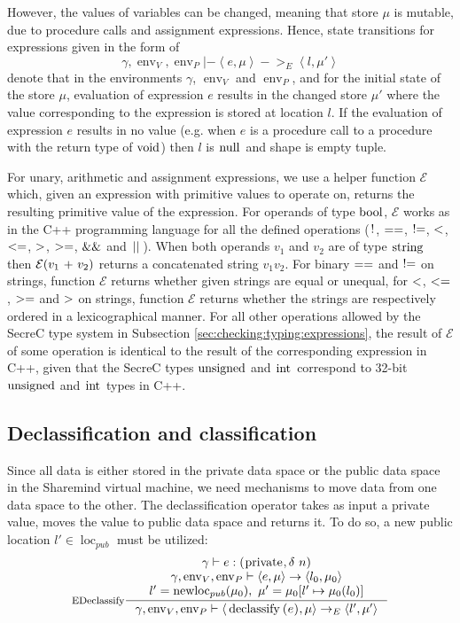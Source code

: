 \documentclass[a4paper, 10pt, draft]{report}
\DeclareMathOperator*{\env}{env}
\DeclareMathOperator*{\newloc}{newloc}
\newcommand{\mycode}[1]{\ensuremath{\mbox{\lstinline{#1}}}}
\begin{document}
However, the values of variables can be changed, meaning that store $\mu$ is
mutable, due to procedure calls and assignment expressions. Hence, state
transitions for expressions given in the form of
\[
\gamma, \operatorname{env}_V, \operatorname{env}_P |-
  \left\langle e, \mu \right\rangle ->_E \left\langle l, \mu' \right\rangle
\]
denote that in the environments $\gamma$, $\operatorname{env}_V$ and
$\operatorname{env}_P$, and for the initial state of the store $\mu$,
evaluation of expression $e$ results in the changed store $\mu'$ where the
value corresponding to the expression is stored at location $l$. If the
evaluation of expression $e$ results in no value (e.g. when $e$ is a
procedure call to a procedure with the return type of \mycode{void}) then
$l$ is \mycode{null} and shape is empty tuple.

For unary, arithmetic and assignment expressions, we use a helper function
$\mathcal{E}$ which, given an expression with primitive values to operate on,
returns the resulting primitive value of the expression. For operands of type
\mycode{bool}, $\mathcal{E}$ works as in the C++ programming language\cite{C++}
for all the defined operations (\mycode{!}, \mycode{==}, \mycode{!=},
\mycode{<}, \mycode{<=}, \mycode{>}, \mycode{>=}, \mycode{&&} and \mycode{||}).
When both operands $v_1$ and $v_2$ are of type \mycode{string} then
$\mathcal{E}\!\left(v_1\ \mycode{+}\ v_2\right)$ returns a concatenated string
$v_1v_2$. For binary \mycode{==} and \mycode{!=} on strings, function
$\mathcal{E}$ returns whether given strings are equal or unequal, for
\mycode{<}, \mycode{<=}, \mycode{>=} and \mycode{>} on strings, function
$\mathcal{E}$ returns whether the strings are respectively ordered in a
lexicographical manner. For all other operations allowed by the SecreC type
system in Subsection \ref{sec:checking:typing:expressions}, the result of
$\mathcal{E}$ of some operation is identical to the result of the corresponding
expression in C++, given that the SecreC types \mycode{unsigned} and
\mycode{int} correspond to 32-bit \mycode{unsigned} and \mycode{int} types in
C++.

\subsection{Declassification and classification}\label{sec:semantics:expr:declassify}

Since all data is either stored in the private data space or the public data
space in the Sharemind virtual machine, we need mechanisms to move data from
one data space to the other. The declassification operator takes as input a
private value, moves the value to public data space and returns it. To do so, a
new public location $l'\in \operatorname{loc}_{pub}$ must be utilized:
\[ \inference[EDeclassify]
{
  \gamma |- e : \left(\mycode{private}, \delta\ n \right) \\
  \gamma, \env_V, \env_P |- \left< e, \mu \right> \to \left< l_0, \mu_0\right> \\
  l' = \newloc_{pub}(\mu_0),\ \mu' = \mu_0[l' \mapsto \mu_0(l_0)]
}{
  \gamma, \env_V, \env_P |- \left< \mycode{declassify(}e\mycode{)}, \mu \right> \to_E \left< l', \mu' \right>
} \]
\end{document}
